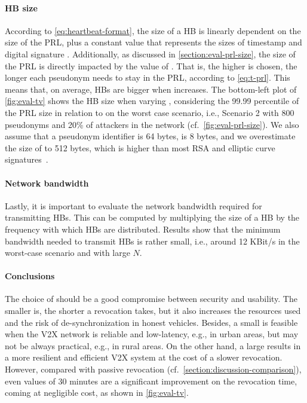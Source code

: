 \paragraph{\ac{HB} size}
%
According to \cref{eq:heartbeat-format}, the size of a \ac{HB} is linearly
dependent on the size of the \ac{PRL}, plus a constant value that represents the
sizes of timestamp \paramthb{} and digital signature \funcsignature{}.
Additionally, as discussed in \cref{section:eval-prl-size}, the size of the
\ac{PRL} is directly impacted by the value of \paramtt{}. That is, the higher
\paramtt{} is chosen, the longer each pseudonym needs to stay in the \ac{PRL},
according to \cref{eq:t-prl}. This means that, on average, \acp{HB} are bigger
when \paramtt{} increases. The bottom-left plot of \cref{fig:eval-tv} shows the
\ac{HB} size when varying \paramtt{}, considering the 99.99 percentile of the
\ac{PRL} size in relation to \paramtt{} on the worst case scenario, i.e.,
Scenario 2 with 800 pseudonyms and 20\% of attackers in the network
(cf.~\cref{fig:eval-prl-size}). We also assume that a pseudonym identifier is 64
bytes, \paramthb{} is 8 bytes, and we overestimate the size of \funcsignature{}
to 512 bytes, which is higher than most RSA and elliptic curve
signatures~\cite{nistDSS}.

\paragraph{Network bandwidth}
%
Lastly, it is important to evaluate the network bandwidth required for
transmitting \acp{HB}. This can be computed by multiplying the size of a \ac{HB}
by the frequency with which \acp{HB} are distributed. Results show that the
minimum bandwidth needed to transmit \acp{HB} is rather small, i.e., around 12
KBit/s in the worst-case scenario and with large $N$.

\paragraph{Conclusions}
%
The choice of \paramtt{} should be a good compromise between security and
usability. The smaller \paramtt{} is, the shorter a revocation takes, but it
also increases the resources used and the risk of de-synchronization in honest
vehicles. Besides, a small \paramtt{} is feasible when the \ac{V2X} network is
reliable and low-latency, e.g., in urban areas, but may not be always practical,
e.g., in rural areas. On the other hand, a large \paramtt{} results in a more
resilient and efficient \ac{V2X} system at the cost of a slower revocation.
However, compared with passive revocation
(cf.~\cref{section:discussion-comparison}), even \paramteff{} values of 30
minutes are a significant improvement on the revocation time, coming at
negligible cost, as shown in \cref{fig:eval-tv}.
